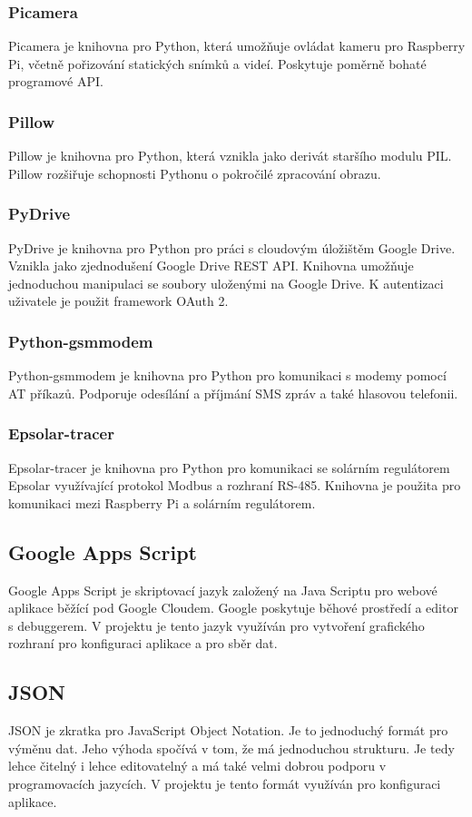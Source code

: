 \subsubsection{Picamera}
Picamera je knihovna pro Python, která umožňuje ovládat kameru pro Raspberry Pi, včetně pořizování statických snímků a videí. Poskytuje poměrně bohaté programové API.

\subsubsection{Pillow}
Pillow je knihovna pro Python, která vznikla jako derivát staršího modulu PIL. Pillow rozšiřuje schopnosti Pythonu o pokročilé zpracování obrazu.

\subsubsection{PyDrive}
PyDrive je knihovna pro Python pro práci s cloudovým úložištěm Google Drive. Vznikla jako zjednodušení Google Drive REST API. Knihovna umožňuje jednoduchou manipulaci se soubory uloženými na Google Drive. K autentizaci uživatele je použit framework OAuth 2.

\subsubsection{Python-gsmmodem}
Python-gsmmodem je knihovna pro Python pro komunikaci s modemy pomocí AT příkazů. Podporuje odesílání a příjmání SMS zpráv a také hlasovou telefonii.

\subsubsection{Epsolar-tracer}
Epsolar-tracer je knihovna pro Python pro komunikaci se solárním regulátorem Epsolar využívající protokol Modbus a rozhraní RS-485. Knihovna je použita pro komunikaci mezi Raspberry Pi a solárním regulátorem.

\subsection*{Google Apps Script}
Google Apps Script je skriptovací jazyk založený na Java Scriptu pro webové aplikace běžící pod Google Cloudem. Google poskytuje běhové prostředí a editor s debuggerem. V projektu je tento jazyk využíván pro vytvoření grafického rozhraní pro konfiguraci aplikace a pro sběr dat.

\subsection*{JSON}
JSON je zkratka pro JavaScript Object Notation. Je to jednoduchý formát pro výměnu dat. Jeho výhoda spočívá v tom, že má jednoduchou strukturu. Je tedy lehce čitelný i lehce editovatelný a má také velmi dobrou podporu v programovacích jazycích. V projektu je tento formát využíván pro konfiguraci aplikace.

